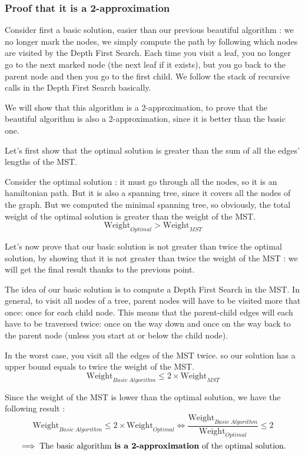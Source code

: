 \documentclass[11pt]{article}
\begin{document}
\subsubsection{Proof that it is a 2-approximation}

Consider first a basic solution, easier than our previous beautiful algorithm : we no longer mark the nodes, 
we simply compute the path by following which nodes are visited by the Depth First Search. Each time you visit a leaf, 
you no longer go to the next marked node (the next leaf if it exists), but you go back to the parent node and then you 
go to the first child. We follow the stack of recursive calls in the Depth First Search basically.

We will show that this algorithm is a 2-approximation, to prove that the beautiful algorithm 
is also a 2-approximation, since it is better than the basic one.

Let's first show that the optimal solution is greater than the sum of all the edges' lengths of the MST.

Consider the optimal solution : it must go through all the nodes, so it is an hamiltonian path. But it is also a spanning tree, since it covers all the nodes of the graph.
But we computed the minimal spanning tree, so obviously, the total weight of the optimal solution is greater than the weight of the MST.
\[
	\text{Weight}_{Optimal} > \text{Weight}_{MST}
\]

Let's now prove that our basic solution is not greater than twice the optimal solution, by showing that it is not greater than twice the weight of the MST : we will get the final result thanks to the previous point.

The idea of our basic solution is to compute a Depth First Search in the MST.
In general, to visit all nodes of a tree, parent nodes will have to be visited more that once: once for each child node. This means that the parent-child edges will each have to be traversed twice: once on the way down and once on the way back to the parent node (unless you start at or below the child node).

In the worst case, you visit all the edges of the MST twice. so  our solution has a upper bound equals to twice the weight of the MST.
\[
	\text{Weight}_{Basic \; Algorithm} \leq 2 \times \text{Weight}_{MST}
\]

Since the weight of the MST is lower than the optimal solution, we have the following result :
\[
	\text{Weight}_{Basic \; Algorithm} \leq 2 \times \text{Weight}_{Optimal} \iff \boxed{\frac{\text{Weight}_{Basic \; Algorithm}}{\text{Weight}_{Optimal}} \leq 2}
\]
\[
	\implies \text{The basic algorithm \textbf{is a 2-approximation} of the optimal solution.}
\]
\end{document}
